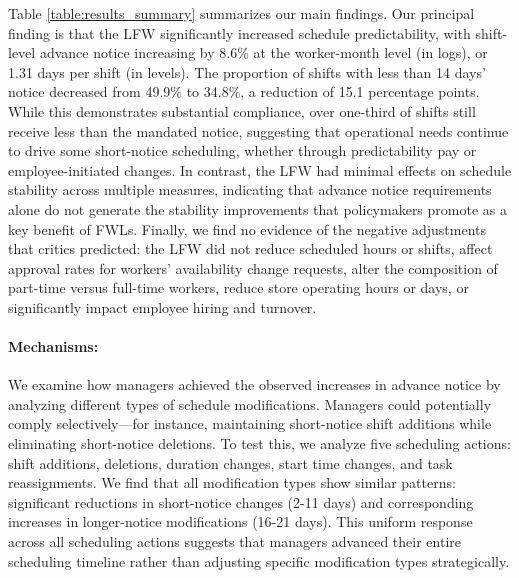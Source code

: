 \documentclass[letterpaper,11pt,leqno]{article}
\theoremstyle{paper}
\begin{document}
Table \ref{table:results_summary} summarizes our main findings. Our principal finding is that the LFW significantly increased schedule predictability, with shift-level advance notice increasing by 8.6\% at the worker-month level (in logs), or 1.31 days per shift (in levels). The proportion of shifts with less than 14 days' notice decreased from 49.9\% to 34.8\%, a reduction of 15.1 percentage points. While this demonstrates substantial compliance, over one-third of shifts still receive less than the mandated notice, suggesting that operational needs continue to drive some short-notice scheduling, whether through predictability pay or employee-initiated changes. In contrast, the LFW had minimal effects on schedule stability across multiple measures, indicating that advance notice requirements alone do not generate the stability improvements that policymakers promote as a key benefit of FWLs. Finally, we find no evidence of the negative adjustments that critics predicted: the LFW did not reduce scheduled hours or shifts, affect approval rates for workers' availability change requests, alter the composition of part-time versus full-time workers, reduce store operating hours or days, or significantly impact employee hiring and turnover. 


\paragraph{Mechanisms:}
We examine how managers achieved the observed increases in advance notice by analyzing different types of schedule modifications. Managers could potentially comply selectively—for instance, maintaining short-notice shift additions while eliminating short-notice deletions. To test this, we analyze five scheduling actions: shift additions, deletions, duration changes, start time changes, and task reassignments. We find that all modification types show similar patterns: significant reductions in short-notice changes (2-11 days) and corresponding increases in longer-notice modifications (16-21 days). This uniform response across all scheduling actions suggests that managers advanced their entire scheduling timeline rather than adjusting specific modification types strategically.
\end{document}
